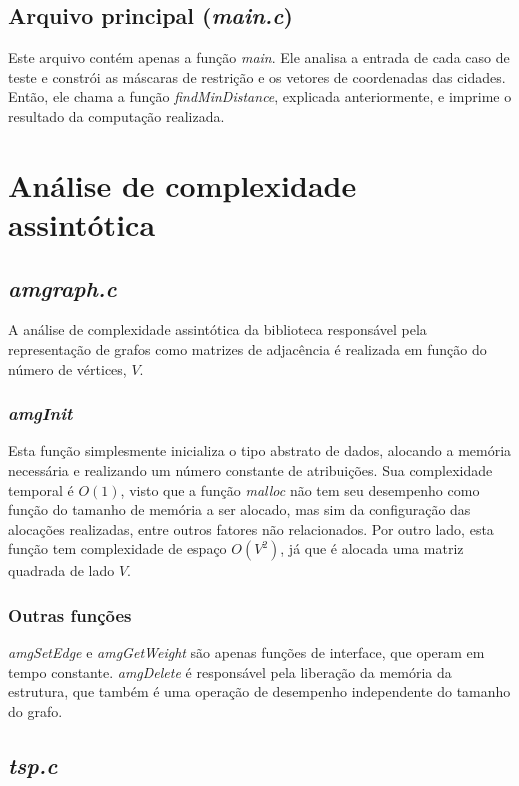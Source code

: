 \documentclass[10pt,a4paper]{article}
\numberwithin{equation}{section}
\begin{document}
\subsection{Arquivo principal (\emph{main.c})}

Este arquivo contém apenas a função \emph{main}. Ele analisa a entrada de cada caso de teste e constrói as máscaras de restrição e os vetores de coordenadas das cidades. Então, ele chama a função \emph{findMinDistance}, explicada anteriormente, e imprime o resultado da computação realizada.

\section{Análise de complexidade assintótica}

\subsection{\emph{amgraph.c}}

A análise de complexidade assintótica da biblioteca responsável pela representação de grafos como matrizes de adjacência é realizada em função do número de vértices, $V$.

\subsubsection*{\emph{amgInit}}

Esta função simplesmente inicializa o tipo abstrato de dados, alocando a memória necessária e realizando um número constante de atribuições. Sua complexidade temporal é $O(1)$, visto que a função \emph{malloc} não tem seu desempenho como função do tamanho de memória a ser alocado, mas sim da configuração das alocações realizadas, entre outros fatores não relacionados. Por outro lado, esta função tem complexidade de espaço $O(V^2)$, já que é alocada uma matriz quadrada de lado $V$.

\subsubsection*{Outras funções}

\emph{amgSetEdge} e \emph{amgGetWeight} são apenas funções de interface, que operam em tempo constante. \emph{amgDelete} é responsável pela liberação da memória da estrutura, que também é uma operação de desempenho independente do tamanho do grafo.

\subsection{\emph{tsp.c}}
\end{document}
